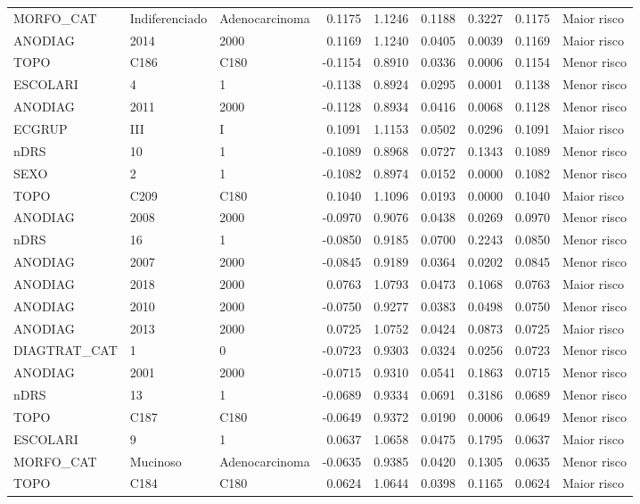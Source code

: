 \begin{table}
\begin{tabular}{lllrrrrrl}
MORFO_CAT & Indiferenciado & Adenocarcinoma & 0.1175 & 1.1246 & 0.1188 & 0.3227 & 0.1175 & Maior risco \\
ANODIAG & 2014 & 2000 & 0.1169 & 1.1240 & 0.0405 & 0.0039 & 0.1169 & Maior risco \\
TOPO & C186 & C180 & -0.1154 & 0.8910 & 0.0336 & 0.0006 & 0.1154 & Menor risco \\
ESCOLARI & 4 & 1 & -0.1138 & 0.8924 & 0.0295 & 0.0001 & 0.1138 & Menor risco \\
ANODIAG & 2011 & 2000 & -0.1128 & 0.8934 & 0.0416 & 0.0068 & 0.1128 & Menor risco \\
ECGRUP & III & I & 0.1091 & 1.1153 & 0.0502 & 0.0296 & 0.1091 & Maior risco \\
nDRS & 10 & 1 & -0.1089 & 0.8968 & 0.0727 & 0.1343 & 0.1089 & Menor risco \\
SEXO & 2 & 1 & -0.1082 & 0.8974 & 0.0152 & 0.0000 & 0.1082 & Menor risco \\
TOPO & C209 & C180 & 0.1040 & 1.1096 & 0.0193 & 0.0000 & 0.1040 & Maior risco \\
ANODIAG & 2008 & 2000 & -0.0970 & 0.9076 & 0.0438 & 0.0269 & 0.0970 & Menor risco \\
nDRS & 16 & 1 & -0.0850 & 0.9185 & 0.0700 & 0.2243 & 0.0850 & Menor risco \\
ANODIAG & 2007 & 2000 & -0.0845 & 0.9189 & 0.0364 & 0.0202 & 0.0845 & Menor risco \\
ANODIAG & 2018 & 2000 & 0.0763 & 1.0793 & 0.0473 & 0.1068 & 0.0763 & Maior risco \\
ANODIAG & 2010 & 2000 & -0.0750 & 0.9277 & 0.0383 & 0.0498 & 0.0750 & Menor risco \\
ANODIAG & 2013 & 2000 & 0.0725 & 1.0752 & 0.0424 & 0.0873 & 0.0725 & Maior risco \\
DIAGTRAT_CAT & 1 & 0 & -0.0723 & 0.9303 & 0.0324 & 0.0256 & 0.0723 & Menor risco \\
ANODIAG & 2001 & 2000 & -0.0715 & 0.9310 & 0.0541 & 0.1863 & 0.0715 & Menor risco \\
nDRS & 13 & 1 & -0.0689 & 0.9334 & 0.0691 & 0.3186 & 0.0689 & Menor risco \\
TOPO & C187 & C180 & -0.0649 & 0.9372 & 0.0190 & 0.0006 & 0.0649 & Menor risco \\
ESCOLARI & 9 & 1 & 0.0637 & 1.0658 & 0.0475 & 0.1795 & 0.0637 & Maior risco \\
MORFO_CAT & Mucinoso & Adenocarcinoma & -0.0635 & 0.9385 & 0.0420 & 0.1305 & 0.0635 & Menor risco \\
TOPO & C184 & C180 & 0.0624 & 1.0644 & 0.0398 & 0.1165 & 0.0624 & Maior risco \\

\end{tabular}
\end{table}
